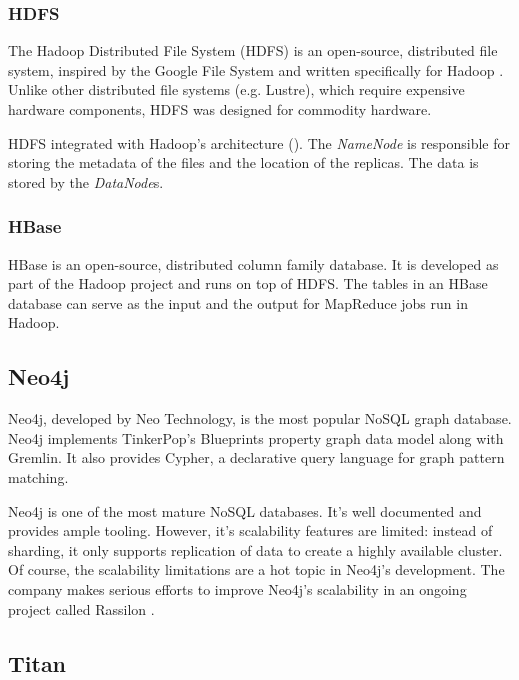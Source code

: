 \subsubsection{HDFS}

The Hadoop Distributed File System (HDFS) is an open-source, distributed file system, inspired by the Google File System and written specifically for Hadoop \cite{Hadoop}. Unlike other distributed file systems (e.g. Lustre), which require expensive hardware components, HDFS was designed for commodity hardware.

HDFS integrated with Hadoop's architecture (). The \emph{NameNode} is responsible for storing the metadata of the files and the location of the replicas. The data is stored by the \emph{DataNode}s.


\subsubsection{HBase}

HBase is an open-source, distributed column family database. It is developed as part of the Hadoop project and runs on top of HDFS. The tables in an HBase database can serve as the input and the output for MapReduce jobs run in Hadoop.

\subsection{Neo4j}

Neo4j, developed by Neo Technology, is the most popular NoSQL graph database. Neo4j implements TinkerPop's Blueprints property graph data model along with Gremlin. It also provides Cypher, a declarative query language for graph pattern matching. 

Neo4j is one of the most mature NoSQL databases. It's well documented and provides ample tooling. However, it's scalability features are limited: instead of sharding, it only supports replication of data to create a highly available cluster. Of course, the scalability limitations are a hot topic in Neo4j's development. The company makes serious efforts to improve Neo4j's scalability in an ongoing project called Rassilon \cite{rassilon}.


\subsection{Titan}

